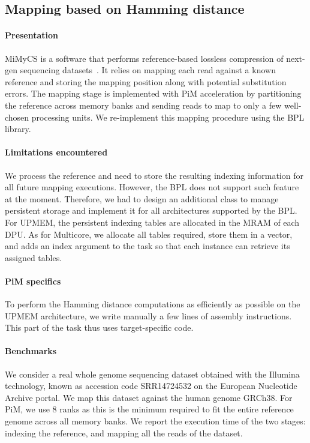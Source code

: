 \subsection{Mapping based on Hamming distance}
\label{sec:mapping}

\paragraph{Presentation}MiMyCS is a software that performs reference-based lossless compression of next-gen sequencing datasets~\cite{DeMoor2024}.
It relies on mapping each read against a known reference and storing the mapping position along with potential substitution errors.
The mapping stage is implemented with PiM acceleration by partitioning the reference across memory banks and sending reads to map to only a few well-chosen processing units.
We re-implement this mapping procedure using the BPL library.

\paragraph{Limitations encountered} We process the reference and need to store the resulting indexing information for all future mapping executions.
However, the BPL does not support such feature at the moment.
Therefore, we had to design an additional class to manage persistent storage and implement it for all architectures supported by the BPL.
For UPMEM, the persistent indexing tables are allocated in the MRAM of each DPU.
As for Multicore, we allocate all tables required, store them in a vector, and adds an index argument to the task so that each instance can retrieve its assigned tables.

\paragraph{PiM specifics} To perform the Hamming distance computations as efficiently as possible on the UPMEM architecture, we write manually a few lines of assembly instructions.
This part of the task thus uses target-specific code.

\paragraph{Benchmarks} We consider a real whole genome sequencing dataset obtained with the Illumina technology, known as accession code SRR14724532 on the European Nucleotide Archive portal.
We map this dataset against the human genome GRCh38.
For PiM, we use 8 ranks as this is the minimum required to fit the entire reference genome across all memory banks.
We report the execution time of the two stages: indexing the reference, and mapping all the reads of the dataset.

